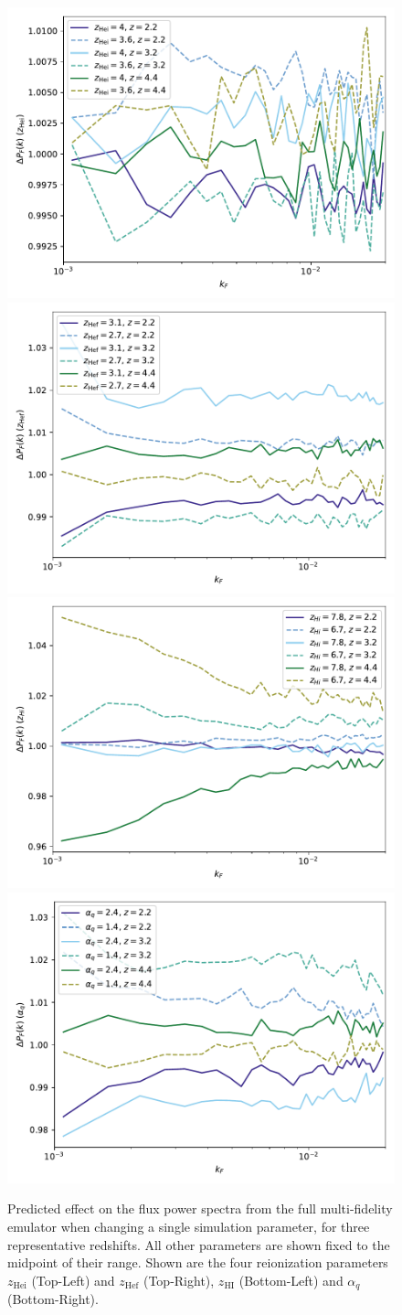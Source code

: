 \documentclass[a4paper,11pt]{article}
\begin{document}
\begin{figure}
    \centering
	\includegraphics[width=0.48\columnwidth]{figures/single_param_herei.pdf}
    \includegraphics[width=0.48\columnwidth]{figures/single_param_heref.pdf}
	\includegraphics[width=0.48\columnwidth]{figures/single_param_hireionz.pdf}
    \includegraphics[width=0.48\columnwidth]{figures/single_param_alphaq.pdf}
    \caption{Predicted effect on the flux power spectra from the full multi-fidelity emulator when changing a single simulation parameter, for three representative redshifts. All other parameters are shown fixed to the midpoint of their range. Shown are the four reionization parameters $z_\mathrm{Hei}$ (Top-Left) and $z_\mathrm{Hef}$ (Top-Right), $z_\mathrm{HI}$ (Bottom-Left) and $\alpha_q$ (Bottom-Right).}
    \label{fig:zhefluxpower}
\end{figure}
\end{document}
